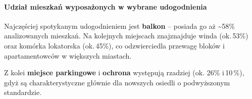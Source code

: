 \documentclass[11pt]{article}
\begin{document}
    \paragraph{Udział mieszkań wyposażonych w wybrane
udogodnienia}\label{udziaux142-mieszkaux144-wyposaux17conych-w-wybrane-udogodnienia}

Najczęściej spotykanym udogodnieniem jest \textbf{balkon} -- posiada go
aż \textasciitilde58\% analizowanych mieszkań. Na kolejnych miejscach
znajznajduje winda (ok.\,53\%) oraz komórka lokatorska (ok.\,45\%), co
odzwierciedla przewagę bloków i apartamentowców w większych miastach.

Z kolei \textbf{miejsce parkingowe} i \textbf{ochrona} występują
rzadziej (ok. 26\% i\,10\,\%), gdyż są charakterystyczne głównie dla
nowszych osiedli o podwyższonym standardzie.
\end{document}
